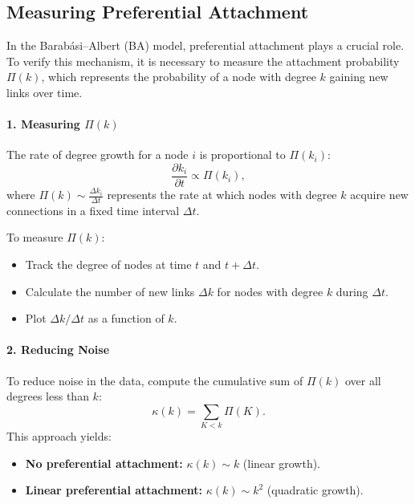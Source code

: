 \documentclass{article}
\begin{document}
\subsection{Measuring Preferential Attachment}

In the Barabási–Albert (BA) model, preferential attachment plays a crucial role. To verify this mechanism, it is necessary to measure the attachment probability \( \Pi(k) \), which represents the probability of a node with degree \( k \) gaining new links over time.

\paragraph{1. Measuring \( \Pi(k) \)}
The rate of degree growth for a node \( i \) is proportional to \( \Pi(k_i) \):
\begin{equation}
\frac{\partial k_i}{\partial t} \propto \Pi(k_i),
\end{equation}
where \( \Pi(k) \sim \frac{\Delta k_i}{\Delta t} \) represents the rate at which nodes with degree \( k \) acquire new connections in a fixed time interval \( \Delta t \).

To measure \( \Pi(k) \):
\begin{itemize}
    \item Track the degree of nodes at time \( t \) and \( t + \Delta t \).
    \item Calculate the number of new links \( \Delta k \) for nodes with degree \( k \) during \( \Delta t \).
    \item Plot \( \Delta k / \Delta t \) as a function of \( k \).
\end{itemize}

\paragraph{2. Reducing Noise}
To reduce noise in the data, compute the cumulative sum of \( \Pi(k) \) over all degrees less than \( k \):
\begin{equation}
\kappa(k) = \sum_{K < k} \Pi(K).
\end{equation}
This approach yields:
\begin{itemize}
    \item \textbf{No preferential attachment:} \( \kappa(k) \sim k \) (linear growth).
    \item \textbf{Linear preferential attachment:} \( \kappa(k) \sim k^2 \) (quadratic growth).
\end{itemize}
\end{document}
